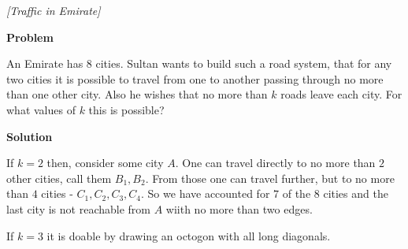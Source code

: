 
%
%




\noindent 

\begin{problem}
\textit{[Traffic in Emirate]}

\textbf{Problem}

An Emirate has 8 cities. Sultan wants to build such a road system, that for any two cities it is possible to travel from one to another passing through no more than one other city. Also he wishes that no more than $k$ roads leave each city. For what values of $k$ this is possible?

\textbf{Solution}

If $k=2$ then, consider some city $A$. One can travel directly to no more than $2$ other cities, call them $B_1, B_2$. From those one can travel further, but to no more than $4$ cities - $C_1,C_2,C_3,C_4$. So we have accounted for $7$ of the $8$ cities and the last city is not reachable from $A$ wiith no more than two edges.

If $k=3$ it is doable by drawing an octogon with all long diagonals.
\end{problem}
%

